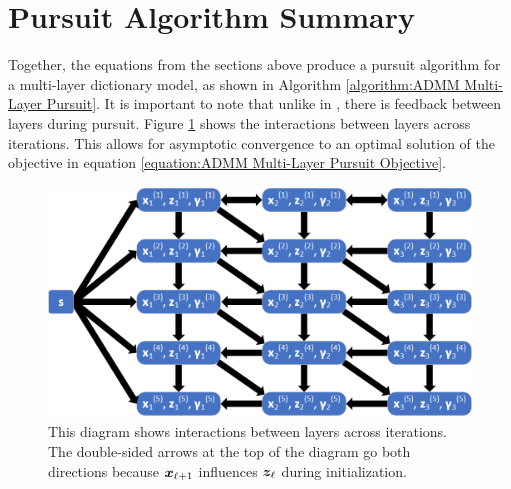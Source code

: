 \section{Pursuit Algorithm Summary}
Together, the equations from the sections above produce a pursuit algorithm for a multi-layer dictionary model, as shown in Algorithm \ref{algorithm:ADMM Multi-Layer Pursuit}. It is important to note that unlike in \cite{zeiler2010deconvolutional}, there is feedback between layers during pursuit.  Figure \ref{figure:ADMM Multi-Layer Pursuit Diagram} shows the interactions between layers across iterations. This allows for asymptotic convergence to an optimal solution of the objective in equation \ref{equation:ADMM Multi-Layer Pursuit Objective}.
\begin{figure}
	\includegraphics[width=\textwidth]{figures/multi-layer_ADMM-node-dependencies-Sparse-Coding.png}
	\caption{This diagram shows interactions between layers across iterations. The double-sided arrows at the top of the diagram go both directions because $\bm{x}_{\ell + 1}$ influences $\bm{z}_{\ell}$ during initialization.}
	\label{figure:ADMM Multi-Layer Pursuit Diagram}
\end{figure}
